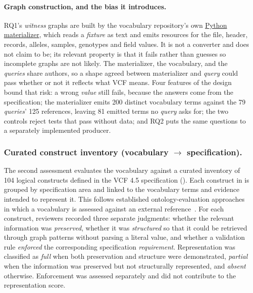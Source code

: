 \paragraph{Graph construction, and the bias it introduces.}
RQ1's \emph{witness} graphs are built by the vocabulary repository's own \href{https://github.com/ecrum19/vcf-core-vocabulary/blob/main/scripts/vcf_examples.py}{Python materializer}, which reads a \emph{fixture} as text and emits resources for the file, header, records, alleles, samples, genotypes and field values.
It is not a converter and does not claim to be; its relevant property is that it fails rather than guesses so incomplete graphs are not likely.
The materializer, the vocabulary, and the \emph{queries} share authors, so a shape agreed between materializer and \emph{query} could pass whether or not it reflects what VCF means.
Four features of the design bound that risk: a wrong \emph{value} still fails, because the answers come from the specification; the materializer emits 200 distinct vocabulary terms against the 79 \emph{queries}' 125 references, leaving 81 emitted terms no \emph{query} asks for; the two controls reject tests that pass without data; and RQ2 puts the same questions to a separately implemented producer.

\subsubsection{Curated construct inventory (vocabulary $\rightarrow$ specification).}
The second assessment evaluates the vocabulary against a curated inventory of 104 logical constructs defined in the VCF 4.5 specification (). 
Each construct in  is grouped by specification area and linked to the vocabulary terms and evidence intended to represent it. 
This follows established ontology-evaluation approaches in which a vocabulary is assessed against an external reference~\cite{gomezperez2001evaluation,sabou2012ontologyevaluation}.
For each construct, reviewers recorded three separate judgments: whether the relevant information was \emph{preserved}, whether it was \emph{structured} so that it could be retrieved through graph patterns without parsing a literal value, and whether a validation rule \emph{enforced} the corresponding specification \emph{requirement}.
Representation was classified as \emph{full} when both preservation and structure were demonstrated, \emph{partial} when the information was preserved but not structurally represented, and \emph{absent} otherwise. 
Enforcement was assessed separately and did not contribute to the representation score. 

